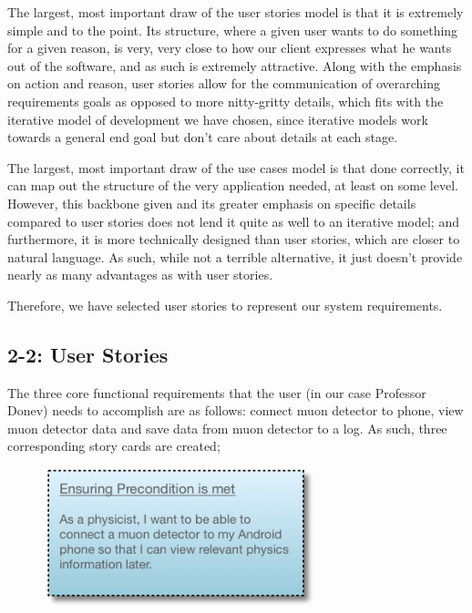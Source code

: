\documentclass[11pt,a4paper]{article}
\begin{document}
The largest, most important draw of the user stories model is that it is extremely simple and to the point. Its structure, where a given user wants to do something for a given reason, is very, very close to how our client expresses what he wants out of the software, and as such is extremely attractive. Along with the emphasis on action and reason, user stories allow for the communication of overarching requirements goals as opposed to more nitty-gritty details, which fits with the iterative model of development we have chosen, since iterative models work towards a general end goal but don’t care about details at each stage.

The largest, most important draw of the use cases model is that done correctly, it can map out the structure of the very application needed, at least on some level. However, this backbone given and its greater emphasis on specific details compared to user stories does not lend it quite as well to an iterative model; and furthermore, it is more technically designed than user stories, which are closer to natural language. As such, while not a terrible alternative, it just doesn’t provide nearly as many advantages as with user stories.

Therefore, we have selected user stories to represent our system requirements.


\subsection*{2-2: User Stories}

The three core functional requirements that the user (in our case Professor Donev) needs to accomplish are as follows: connect muon detector to phone, view muon detector data and save data from muon detector to a log. As such, three corresponding story cards are created; 

\newpage


\begin{figure}[h]
  \centering
  
      \includegraphics[width=0.7\textwidth]{storycard1.png}
  
\end{figure}
\end{document}
